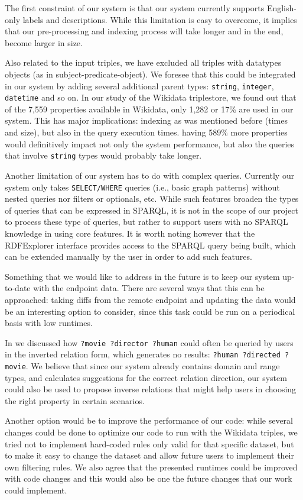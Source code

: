The first constraint of our system is that our system currently supports English-only labels and descriptions. While this limitation is easy to overcome, it implies that our pre-processing and indexing process will take longer and in the end, become larger in size. 

Also related to the input triples, we have excluded all triples with datatypes objects (as in subject-predicate-object). We foresee that this could be integrated in our system by adding several additional parent types: \texttt{string}, \texttt{integer}, \texttt{datetime} and so on. In our study of the Wikidata triplestore, we found out that of the 7,559 properties available in Wikidata, only 1,282 or 17\% are used in our system. This has major implications: indexing as was mentioned before (times and size), but also in the query execution times. having 589\% more properties would definitively impact not only the system performance, but also the queries that involve \texttt{string} types would probably take longer.

Another limitation of our system has to do with complex queries. Currently our system only takes \texttt{SELECT/WHERE} queries (i.e., basic graph patterns) without nested queries nor filters or optionals, etc. While such features broaden the types of queries that can be expressed in SPARQL, it is not in the scope of our project to process these type of queries, but rather to support users with no SPARQL knowledge in using core features. It is worth noting however that the RDFExplorer interface provides access to the SPARQL query being built, which can be extended manually by the user in order to add such features.

Something that we would like to address in the future is to keep our system up-to-date with the endpoint data. There are several ways that this can be approached: taking diffs from the remote endpoint and updating the data would be an interesting option to consider, since this task could be run on a periodical basis with low runtimes. 

In  we discussed how \texttt{?movie ?director ?human} could often be queried by users in the inverted relation form, which generates no results: \texttt{?human ?directed ?movie}. We believe that since our system already contains domain and range types, and calculates suggestions for the correct relation direction, our system could also be used to propose inverse relations that might help users in choosing the right property in certain scenarios.

Another option would be to improve the performance of our code: while several changes could be done to optimize our code to run with the Wikidata triples, we tried not to implement hard-coded rules only valid for that specific dataset, but to make it easy to change the dataset and allow future users to implement their own filtering rules. We also agree that the presented runtimes could be improved with code changes and this would also be one the future changes that our work could implement.